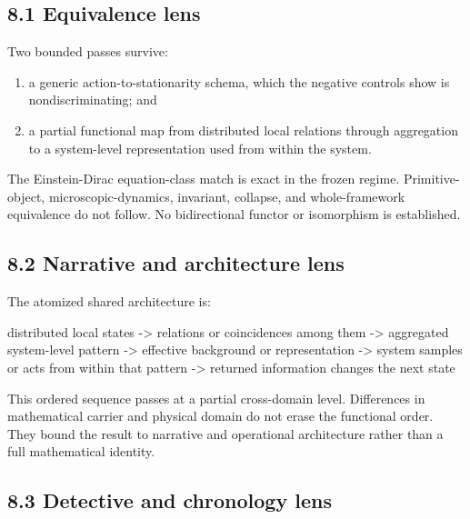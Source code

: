 \documentclass[
  american,
  11pt,
  letterpaper,
]{article}
\newenvironment{Shaded}{}{}
\newcommand{\NormalTok}[1]{#1}
\providecommand{\tightlist}{%
  \setlength{\itemsep}{0pt}\setlength{\parskip}{0pt}}
\begin{document}
\subsection{8.1 Equivalence lens}\label{equivalence-lens}

Two bounded passes survive:

\begin{enumerate}
\def\labelenumi{\arabic{enumi}.}
\tightlist
\item
  a generic action-to-stationarity schema, which the negative controls show is nondiscriminating; and
\item
  a partial functional map from distributed local relations through aggregation to a system-level representation used from within the system.
\end{enumerate}

The Einstein-Dirac equation-class match is exact in the frozen regime. Primitive-object, microscopic-dynamics, invariant, collapse, and whole-framework equivalence do not follow. No bidirectional functor or isomorphism is established.

\subsection{8.2 Narrative and architecture lens}\label{narrative-and-architecture-lens}

The atomized shared architecture is:

\begin{Shaded}
\begin{Highlighting}[]
\NormalTok{distributed local states}
\NormalTok{    {-}\textgreater{} relations or coincidences among them}
\NormalTok{    {-}\textgreater{} aggregated system{-}level pattern}
\NormalTok{    {-}\textgreater{} effective background or representation}
\NormalTok{    {-}\textgreater{} system samples or acts from within that pattern}
\NormalTok{    {-}\textgreater{} returned information changes the next state}
\end{Highlighting}
\end{Shaded}

This ordered sequence passes at a partial cross-domain level. Differences in mathematical carrier and physical domain do not erase the functional order. They bound the result to narrative and operational architecture rather than a full mathematical identity.

\subsection{8.3 Detective and chronology lens}\label{detective-and-chronology-lens}
\end{document}
